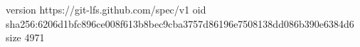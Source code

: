 version https://git-lfs.github.com/spec/v1
oid sha256:6206d1bfc896ce008f613b8bec9cba3757d86196e7508138dd086b390e6384d6
size 4971
